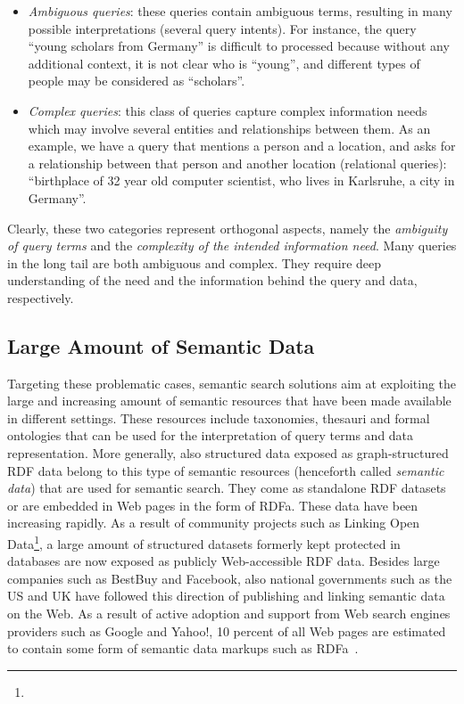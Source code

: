 \begin{itemize}
	\item \emph{Ambiguous queries}: these queries contain ambiguous terms, resulting in many possible interpretations (several query intents). For instance, the query ``young scholars from Germany'' is difficult to processed because without any additional context, it is not clear who is ``young'', and different types of people may be considered as ``scholars''. 

	\item \emph{Complex queries}: this class of queries capture complex information needs which may involve several entities and relationships between them. As an example, we have a query that mentions a person and a location, and asks for a relationship between that person and another location (relational queries):  ``birthplace of 32 year old computer scientist, who lives in Karlsruhe, a city in Germany''. 
\end{itemize}

Clearly, these two categories represent orthogonal aspects, namely the \emph{ambiguity of query terms} and the \emph{complexity of the intended information need}. Many queries in the long tail are both ambiguous and complex. They require deep understanding of the need and the information behind the query and data, respectively. 	

\subsection{Large Amount of Semantic Data}
Targeting these problematic cases, semantic search solutions aim at exploiting the large and increasing amount of semantic resources that have been made available in different settings. These resources include taxonomies, thesauri and formal ontologies that can be used for the interpretation of query terms and data representation. More generally, also structured data exposed as graph-structured RDF data belong to this type of semantic resources (henceforth called \emph{semantic data}) that are used for semantic search. They come as standalone RDF datasets or are embedded in Web pages in the form of RDFa. These data have been increasing rapidly. As a result of community projects such as Linking Open Data\footnote{}, a large amount of structured datasets formerly kept protected in databases are now exposed as publicly Web-accessible RDF data. Besides large companies such as BestBuy and Facebook, also national governments such as the US and UK have followed this direction of publishing and linking semantic data on the Web. As a result of active adoption and support from Web search engines providers such as Google and Yahoo!, 10 percent of all Web pages are estimated to contain some form of semantic data markups such as RDFa~\cite{}. 

